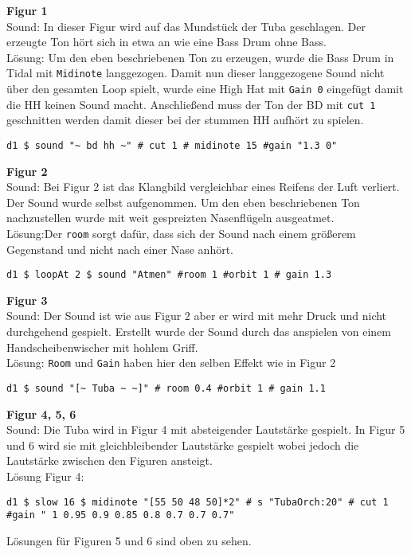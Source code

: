 \documentclass[
10pt, %
a4paper, %
oneside, %
headinclude,footinclude, %
BCOR5mm, %
]{scrartcl}
\begin{document}
\noindent\textbf{Figur 1}\\
 Sound: In dieser Figur wird auf das Mundstück der Tuba geschlagen. Der erzeugte Ton hört sich in etwa an wie eine Bass Drum ohne Bass.\\
Lösung: Um den eben beschriebenen Ton zu erzeugen, wurde die Bass Drum in Tidal mit \verb|Midinote| langgezogen. Damit nun dieser langgezogene Sound nicht über den gesamten Loop spielt, wurde eine High Hat mit \verb|Gain 0| eingefügt damit die HH keinen Sound macht. Anschließend muss der Ton der BD mit \verb|cut 1| geschnitten werden damit dieser bei der stummen HH aufhört zu spielen.
\begin{lstlisting}
d1 $ sound "~ bd hh ~" # cut 1 # midinote 15 #gain "1.3 0"
\end{lstlisting}

\noindent\textbf{Figur 2}\\
Sound: Bei Figur 2 ist das Klangbild vergleichbar eines Reifens der Luft verliert. Der Sound wurde selbst aufgenommen. Um den eben beschriebenen Ton nachzustellen wurde mit weit gespreizten Nasenflügeln ausgeatmet.\\
Lösung:Der \verb|room| sorgt dafür, dass sich der Sound nach einem größerem Gegenstand und nicht nach einer Nase anhört.
\begin{lstlisting}
d1 $ loopAt 2 $ sound "Atmen" #room 1 #orbit 1 # gain 1.3
\end{lstlisting}

\noindent\textbf{Figur 3}\\
Sound: Der Sound ist wie aus Figur 2 aber er wird mit mehr Druck und nicht durchgehend gespielt. Erstellt wurde der Sound durch das anspielen von einem Handscheibenwischer mit hohlem Griff.\\
Lösung: \verb|Room| und \verb|Gain| haben hier den selben Effekt wie in Figur 2
\begin{lstlisting}
d1 $ sound "[~ Tuba ~ ~]" # room 0.4 #orbit 1 # gain 1.1
\end{lstlisting}
\noindent\textbf{Figur 4, 5, 6}\\
Sound: Die Tuba wird in Figur 4 mit absteigender Lautstärke gespielt. In Figur 5 und 6 wird sie mit gleichbleibender Lautstärke gespielt wobei jedoch die Lautstärke
zwischen den Figuren ansteigt.\\
Lösung Figur 4:
\begin{lstlisting}
d1 $ slow 16 $ midinote "[55 50 48 50]*2" # s "TubaOrch:20" # cut 1 #gain " 1 0.95 0.9 0.85 0.8 0.7 0.7 0.7"
\end{lstlisting}
Lösungen für Figuren 5 und 6 sind oben zu sehen.
\end{document}
